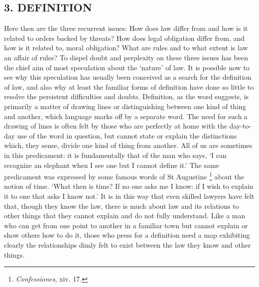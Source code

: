 \subsection{\texorpdfstring{\textbf{3.
DEFINITION}}{3. DEFINITION}}\label{definition}

Here then are the three recurrent issues: How does law differ from and
how is it related to orders backed by threats? How does legal obligation
differ from, and how is it related to, moral obligation? What are rules
and to what extent is law an affair of rules? To dispel doubt and
perplexity on these three issues has been the chief aim of most
speculation about the `nature' of law. It is possible now to see why
this speculation has usually been conceived as a search for the
definition of law, and also why at least the familiar forms of
definition have done so little to resolve the persistent difficulties
and doubts. Definition, as the word suggests, is primarily a matter of
drawing lines or distinguishing between one kind of thing and another,
which language marks off by a separate word. The need for such a drawing
of lines is often felt by those who are perfectly at home with the
day-to-day use of the word in question, but cannot state or explain the
distinctions which, they sense, divide one kind of thing from another.
All of us are sometimes in this predicament: it is fundamentally that of
the man who says, `I can recognize an elephant when I see one but I
cannot define it.' The same predicament was expressed by some famous
words of St Augustine \footnote{\emph{Confessiones}, xiv. 17.} about the
notion of time. `What then is time? If no one asks me I know: if I wish
to explain it to one that asks I know not.' It is in this way that even
skilled lawyers have felt that, though they know the law, there is much
about law and its relations to other things that they cannot explain and
do not fully understand. Like a man who can get from one point to
another in a familiar town but cannot explain or show others how to do
it, those who press for a definition need a map exhibiting clearly the
relationships dimly felt to exist between the law they know and other
things.

